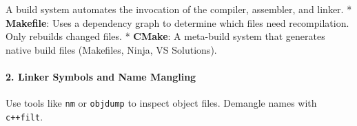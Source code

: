 A build system automates the invocation of the compiler, assembler, and
linker. * \textbf{Makefile}: Uses a dependency graph to determine which
files need recompilation. Only rebuilds changed files. * \textbf{CMake}:
A meta-build system that generates native build files (Makefiles, Ninja,
VS Solutions).

\hypertarget{linker-symbols-and-name-mangling}{%
\paragraph{2. Linker Symbols and Name
Mangling}\label{linker-symbols-and-name-mangling}}

Use tools like \passthrough{\lstinline!nm!} or
\passthrough{\lstinline!objdump!} to inspect object files. Demangle
names with \passthrough{\lstinline!c++filt!}.
